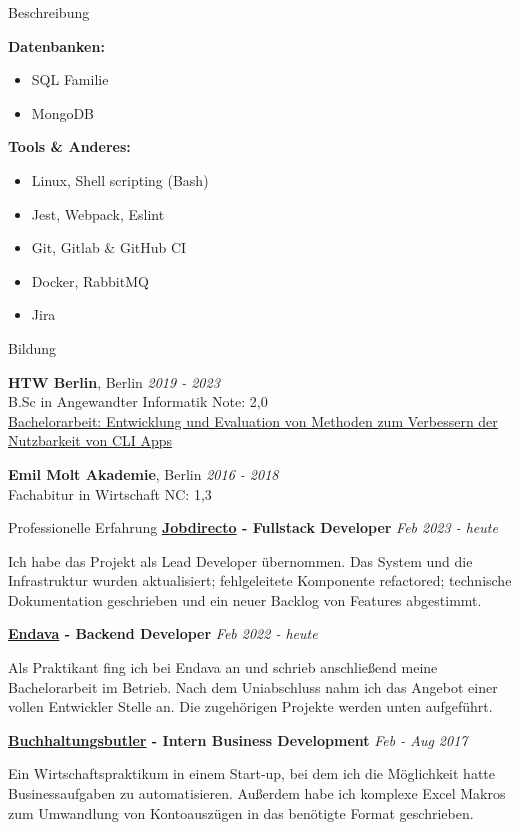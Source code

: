 \documentclass{cv}
\begin{document}
\begin{rSection}{Beschreibung}
\begin{minipage}[t]{\skillWidth\linewidth}
    \textbf{Datenbanken:}
    \begin{itemize}
      \item SQL Familie
      \item MongoDB
    \end{itemize}

    \textbf{Tools \& Anderes:}
    \begin{itemize}
      \item Linux, Shell scripting (Bash)
      \item Jest, Webpack, Eslint
      \item Git, Gitlab \& GitHub CI
      \item Docker, RabbitMQ
      \item Jira
    \end{itemize}

  \end{minipage}
\end{rSection}

\begin{rSection}{Bildung}

{\bf HTW Berlin}, Berlin \hfill {\em 2019 - 2023}\\
B.Sc in Angewandter Informatik
  \hfill Note: 2,0\\
  \href{https://github.com/jneidel/ba}{Bachelorarbeit: Entwicklung und Evaluation von Methoden zum Verbessern der Nutzbarkeit von CLI Apps}

\smallskip

{\bf Emil Molt Akademie}, Berlin \hfill {\em 2016 - 2018}\\
Fachabitur in Wirtschaft
\hfill NC: 1,3

\end{rSection}

\begin{rSection}{Professionelle Erfahrung}
  \textbf{\href{https://www.jobdirecto.com/}{Jobdirecto} - Fullstack Developer}
  \hfill {\em Feb 2023 - heute}

  Ich habe das Projekt als Lead Developer übernommen.
  Das System und die Infrastruktur wurden aktualisiert; fehlgeleitete Komponente
  refactored; technische Dokumentation geschrieben und ein neuer Backlog von Features abgestimmt.

  \textbf{\href{https://www.endava.de/}{Endava} - Backend Developer}
  \hfill {\em Feb 2022 - heute}

  Als Praktikant fing ich bei Endava an und schrieb anschließend meine Bachelorarbeit im Betrieb.
  Nach dem Uniabschluss nahm ich das Angebot einer vollen Entwickler Stelle an.
  Die zugehörigen Projekte werden unten aufgeführt.

  \textbf{\href{https://buchhaltungsbutler.de/}{Buchhaltungsbutler} - Intern Business Development}
  \hfill {\em Feb - Aug 2017}

  Ein Wirtschaftspraktikum in einem Start-up, bei dem ich die Möglichkeit hatte Businessaufgaben zu automatisieren.
  Außerdem habe ich komplexe Excel Makros zum Umwandlung von Kontoauszügen in das benötigte Format geschrieben.
\end{rSection}
\end{document}
